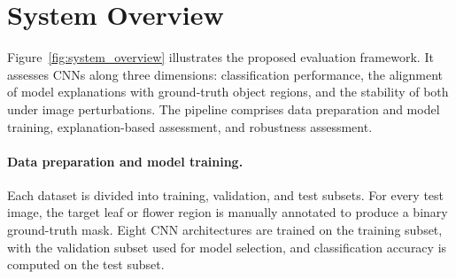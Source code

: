 \documentclass[a4paper,fleqn]{cas-dc}
\begin{document}
%	
%	
	
	\section{System Overview}
	Figure~\ref{fig:system_overview} illustrates the proposed evaluation framework.
	It assesses CNNs along three dimensions: classification performance, the
	alignment of model explanations with ground-truth object regions, and the
	stability of both under image perturbations. 
	The pipeline comprises data preparation and model training, explanation-based assessment, and robustness	assessment.
	
	\paragraph{Data preparation and model training.} 
	Each dataset is divided into training, validation, and test subsets. 
	For every test image, the target leaf or flower region is manually annotated to produce a binary ground-truth mask. 
	Eight CNN architectures are trained on the training subset, with the validation subset used for model selection, and classification accuracy is computed on the test subset.
	
\end{document}
